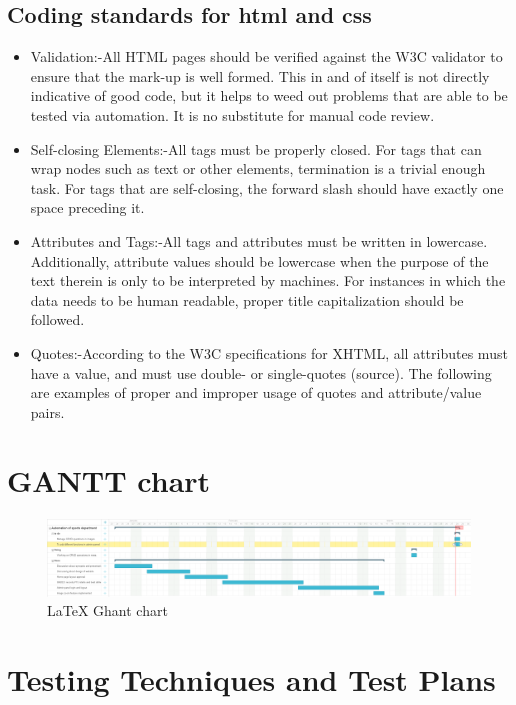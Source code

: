 \subsection{Coding standards for html and css}
\begin{itemize}
\item Validation:-All HTML pages should be verified against the W3C validator to ensure that the mark-up is well formed. This in and of itself is not directly indicative of good code, but it helps to weed out problems that are able to be tested via automation. It is no substitute for manual code review.
\item Self-closing Elements:-All tags must be properly closed. For tags that can wrap nodes such as text or other elements, termination is a trivial enough task. For tags that are self-closing, the forward slash should have exactly one space preceding it.
\item Attributes and Tags:-All tags and attributes must be written in lowercase. Additionally, attribute values should be lowercase when the purpose of the text therein is only to be interpreted by machines. For instances in which the data needs to be human readable, proper title capitalization should be followed.
\item Quotes:-According to the W3C specifications for XHTML, all attributes must have a value, and must use double- or single-quotes (source). The following are examples of proper and improper usage of quotes and attribute/value pairs.

\end{itemize}

	\section{GANTT chart
	}
	\begin{figure}[ht]
\centering
\includegraphics[scale=0.20]{images/GhanttChart.png}
\caption{\LaTeX{} Ghant chart}
\end{figure}
	
	\section{Testing Techniques and Test Plans
}
